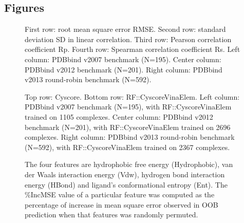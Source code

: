 \documentclass[twocolumn]{bmcart}
\begin{document}
\begin{backmatter}


\section*{Figures}

\begin{figure}[h]
\caption{ First row: root mean square error RMSE. Second row: standard deviation SD in linear correlation. Third row: Pearson correlation coefficient Rp. Fourth row: Spearman correlation coefficient Rs. Left column: PDBbind v2007 benchmark (N=195). Center column: PDBbind v2012 benchmark (N=201). Right column: PDBbind v2013 round-robin benchmark (N=592).}
\label{fig:stat}
\end{figure}

\begin{figure}[h]
\caption{ Top row: Cyscore. Bottom row: RF::CyscoreVinaElem. Left column: PDBbind v2007 benchmark (N=195), with RF::CyscoreVinaElem trained on 1105 complexes. Center column: PDBbind v2012 benchmark (N=201), with RF::CyscoreVinaElem trained on 2696 complexes. Right column: PDBbind v2013 round-robin benchmark (N=592), with RF::CyscoreVinaElem trained on 2367 complexes.}
\label{fig:cor}
\end{figure}

\begin{figure}[h]
\caption{ The four features are hydrophobic free energy (Hydrophobic), van der Waals interaction energy (Vdw), hydrogen bond interaction energy (HBond) and ligand's conformational entropy (Ent). The \%IncMSE value of a particular feature was computed as the percentage of increase in mean square error observed in OOB prediction when that features was randomly permuted.}
\label{fig:varimp}
\end{figure}


\end{backmatter}
\end{document}

